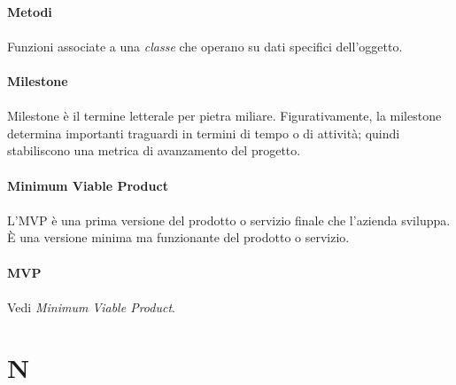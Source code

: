 \documentclass[10pt, a4paper]{article}
\begin{document}
\vspace{2em}
\paragraph{Metodi}\noindent\hrulefill
\paragraph{}Funzioni associate a una \textit{classe\pg} che operano su dati specifici dell'oggetto.


\vspace{2em}
\paragraph{Milestone}\noindent\hrulefill
\paragraph{}Milestone è il termine letterale per pietra miliare. Figurativamente, la milestone determina importanti traguardi in termini di tempo o di attività; quindi stabiliscono una metrica di avanzamento del progetto.

\vspace{2em}
\paragraph{Minimum Viable Product}\noindent\hrulefill
\paragraph{}L’MVP è una prima versione del prodotto o servizio finale che l’azienda sviluppa. È una versione minima ma funzionante del prodotto o servizio.

\vspace{2em}
\paragraph{MVP}\noindent\hrulefill 
\paragraph{}Vedi \textit{Minimum Viable Product\pg}.



\newpage
\section{N}
\vspace{2em}
\end{document}
